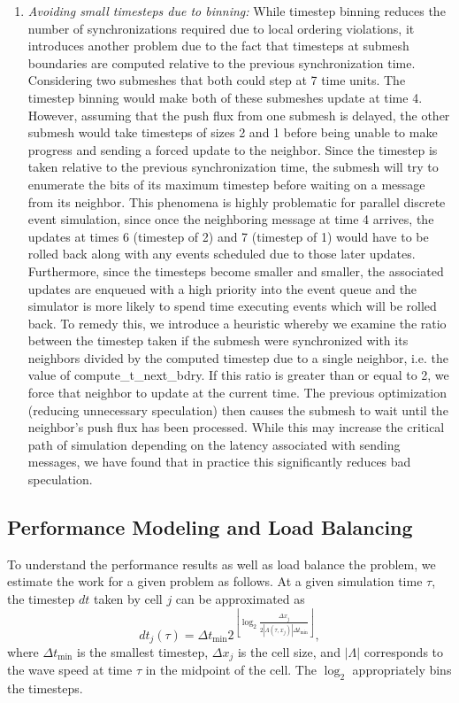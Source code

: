 \begin{enumerate}
    \item {\em Avoiding small timesteps due to binning:} While timestep binning reduces the number of synchronizations required due to local ordering violations, it introduces another problem due to the fact that timesteps at submesh boundaries are computed relative to the previous synchronization time. Considering two submeshes that both could step at 7 time units. The timestep binning would make both of these submeshes update at time 4. However, assuming that the push flux from one submesh is delayed, the other submesh would take timesteps of sizes 2 and 1 before being unable to make progress and sending a forced update to the neighbor. Since the timestep is taken relative to the previous synchronization time, the submesh will try to enumerate the bits of its maximum timestep before waiting on a message from its neighbor. This phenomena is highly problematic for parallel discrete event simulation, since once the neighboring message at time 4 arrives, the updates at times 6 (timestep of 2) and 7 (timestep of 1) would have to be rolled back along with any events scheduled due to those later updates. Furthermore, since the timesteps become smaller and smaller, the associated updates are enqueued with a high priority into the event queue and the simulator is more likely to spend time executing events which will be rolled back.  To remedy this, we introduce a heuristic whereby we examine the ratio between the timestep taken if the submesh were synchronized with its neighbors divided by the computed timestep due to a single neighbor, i.e. the value of {\sc compute\_t\_next\_bdry}. If this ratio is greater than or equal to 2, we force that neighbor to update at the current time. The previous optimization (reducing unnecessary speculation) then causes the submesh to wait until the neighbor's push flux has been processed. While this may increase the critical path of simulation depending on the latency associated with sending messages, we have found that in practice this significantly reduces bad speculation.
\end{enumerate}

\subsection{Performance Modeling and Load Balancing}
\label{sec:load-balancing}
To understand the performance results as well as load balance the problem, we estimate the work for a given problem as follows. At a given simulation time $\tau$, the timestep $dt$ taken by cell $j$ can be approximated as
\begin{equation*}
dt_j(\tau) = \Delta t_{\min} 2^{\left\lfloor \log_2 \frac{ \Delta x_j}{2 |\Lambda(\tau, x_j)| \Delta t_{\min}}\right\rfloor},
\end{equation*}
where $\Delta t_{\min}$ is the smallest timestep, $\Delta x_j$ is the cell size, and $|\Lambda|$ corresponds to the wave speed at time $\tau$ in the midpoint of the cell. The $\log_2$  appropriately bins the timesteps.

